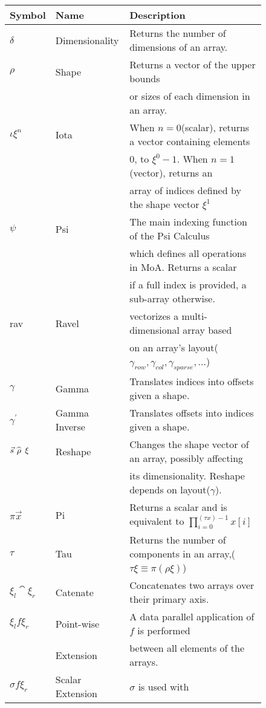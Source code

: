 \begin{figure}[h]
\tiny
\begin{tabular}{|l|l|l|}
\hline\hline
{\bf Symbol} & {\bf Name}& {\bf Description} \\ \hline
$\delta$ & Dimensionality & Returns the number of dimensions of an array.\\ \hline
$\rho$ & Shape & Returns a vector of the upper bounds \\
& &or sizes of each dimension in an array. \\ \hline
$\iota \xi^n$  & Iota & When $n=0$(scalar),
returns a vector containing elements\\
& & $0$, to $\xi^0 - 1$. When $n = 1$(vector), returns an \\
& & array of indices  defined by the shape vector $\xi^1$ \\ \hline
$\psi$ & Psi & The main indexing function of the Psi Calculus \\
& & which defines all operations in MoA.   Returns a scalar \\
& & if a full index is provided, a sub-array otherwise. \\ \hline
\mbox{rav} & Ravel & vectorizes a multi-dimensional array based   \\
&&on an  array's layout($\gamma_{row},\gamma_{col},\gamma_{sparse}, ...$)\\ \hline
$\gamma$ & Gamma & Translates indices into offsets given a shape. \\ \hline
$\gamma^{'}$ & Gamma Inverse & Translates offsets into indices given a shape. \\ \hline
$\vec s \,\widehat{\,\rho\,}\; \xi $ & Reshape& Changes the shape vector of an array,
 possibly affecting  \\
& &its dimensionality. Reshape depends on
layout($\gamma$). \\ \hline
$\pi \vec x$ & Pi & Returns a scalar and is equivalent to $\prod_{i=0}^{(\tau x)-1}x[i]$ \\ \hline
$\tau$& Tau & Returns the number of components in an array,($\tau \xi \equiv
\pi (\rho \xi) $) \\ \hline
$\xi_l \cat \xi_r $ & Catenate& Concatenates two arrays over their
primary axis. \\ \hline
$\xi_l f \xi_r $ & Point-wise  & A data parallel application of $f$ is performed \\
&Extension &  between all elements of the arrays.\\ \hline
$\sigma f \xi_r $ & Scalar Extension & $\sigma$ is used with

\end{tabular}
\end{figure}
